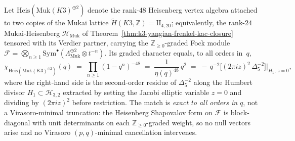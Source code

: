 \begin{theorem}
\label{thm:plat-heis-mukai-eta48}
Let $\mathrm{Heis}(\mathrm{Muk}(K3)^{\oplus 2})$ denote the rank-$48$
Heisenberg vertex algebra attached to two copies of the Mukai lattice
$\widetilde H(K3,\mathbb Z) = \mathrm{II}_{4,20}$; equivalently, the
rank-$24$ Mukai-Heisenberg $\mathcal H_{\mathrm{Muk}}$ of
Theorem~\ref{thm:k3-yangian-frenkel-kac-closure} tensored with its
Verdier partner, carrying the $\mathbb Z_{\geq 0}$-graded Fock module
$\mathcal F = \bigotimes_{n \geq 1} \mathrm{Sym}^\bullet(\Lambda_{\mathrm{Muk}}^{\oplus 2}\otimes t^{-n})$.
Its graded character equals, to all orders in~$q$,
\begin{equation}
\label{eq:heis-mukai-eta48}
\chi_{\mathrm{Heis}(\mathrm{Muk}(K3)^{\oplus 2})}(q)
\;=\;
\prod_{n \geq 1}(1 - q^n)^{-48}
\;=\;
\frac{1}{\eta(q)^{48}}\,q^{2}
\;=\;
-\, q^{-2}\bigl[(2\pi i z)^{2}\,\Delta_5^{-2}\bigr]\Big|_{H_1,\, z = 0},
\end{equation}
where the right-hand side is the second-order residue of
$\Delta_5^{-2}$ along the Humbert divisor $H_1\subset\mathcal H_{3,2}$
extracted by setting the Jacobi elliptic variable $z=0$ and dividing by
$(2\pi i z)^2$ before restriction. The match is \emph{exact to all
orders in $q$}, not a Virasoro-minimal truncation: the Heisenberg
Shapovalov form on $\mathcal F$ is block-diagonal with unit determinants
on each $\mathbb Z_{\geq 0}$-graded weight, so no null vectors arise and
no Virasoro $(p,q)$-minimal cancellation intervenes.
\end{theorem}

